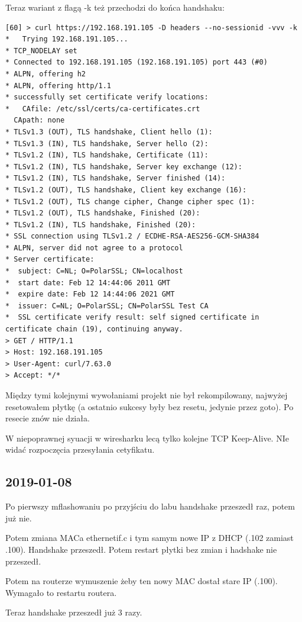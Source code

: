 Teraz wariant z flagą -k też przechodzi do końca handshaku:
\begin{verbatim}
[60] > curl https://192.168.191.105 -D headers --no-sessionid -vvv -k
*   Trying 192.168.191.105...
* TCP_NODELAY set
* Connected to 192.168.191.105 (192.168.191.105) port 443 (#0)
* ALPN, offering h2
* ALPN, offering http/1.1
* successfully set certificate verify locations:
*   CAfile: /etc/ssl/certs/ca-certificates.crt
  CApath: none
* TLSv1.3 (OUT), TLS handshake, Client hello (1):
* TLSv1.3 (IN), TLS handshake, Server hello (2):
* TLSv1.2 (IN), TLS handshake, Certificate (11):
* TLSv1.2 (IN), TLS handshake, Server key exchange (12):
* TLSv1.2 (IN), TLS handshake, Server finished (14):
* TLSv1.2 (OUT), TLS handshake, Client key exchange (16):
* TLSv1.2 (OUT), TLS change cipher, Change cipher spec (1):
* TLSv1.2 (OUT), TLS handshake, Finished (20):
* TLSv1.2 (IN), TLS handshake, Finished (20):
* SSL connection using TLSv1.2 / ECDHE-RSA-AES256-GCM-SHA384
* ALPN, server did not agree to a protocol
* Server certificate:
*  subject: C=NL; O=PolarSSL; CN=localhost
*  start date: Feb 12 14:44:06 2011 GMT
*  expire date: Feb 12 14:44:06 2021 GMT
*  issuer: C=NL; O=PolarSSL; CN=PolarSSL Test CA
*  SSL certificate verify result: self signed certificate in certificate chain (19), continuing anyway.
> GET / HTTP/1.1
> Host: 192.168.191.105
> User-Agent: curl/7.63.0
> Accept: */*
\end{verbatim}



Między tymi kolejnymi wywołaniami projekt nie był rekompilowany, najwyżej resetowałem płytkę (a ostatnio sukcesy były bez resetu, jedynie przez goto).
Po resecie znów nie działa.

W niepoprawnej syuacji w wiresharku lecą tylko kolejne TCP Keep-Alive. NIe widać rozpoczęcia przesyłania cetyfikatu.

\subsection{2019-01-08}
Po pierwszy mflashowaniu po przyjściu do labu handshake przeszedł raz, potem
już nie.

Potem zmiana MACa ethernetif.c i tym samym nowe IP z DHCP (.102 zamiast .100).
Handshake przeszedł.
Potem restart płytki bez zmian i hadshake nie przeszedł.

Potem na routerze wymuszenie żeby ten nowy MAC dostał stare IP (.100).
Wymagało to restartu routera.

Teraz handshake przeszedł już 3 razy.


